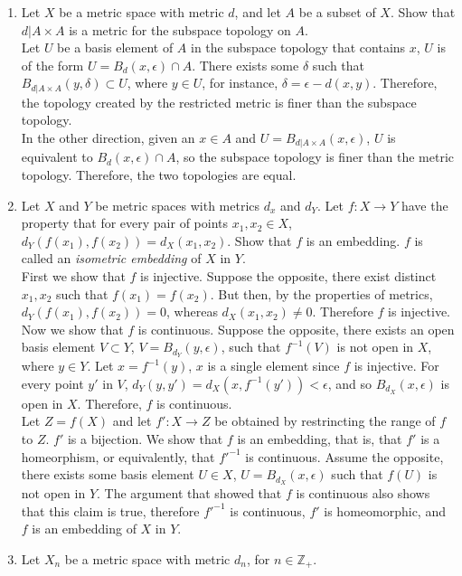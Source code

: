 \documentclass[12pt,letterpaper]{article}
\begin{document}
\RaggedRight
\begin{enumerate}
  \item Let $X$ be a metric space with metric $d$, and let $A$ be a subset of $X$. Show that $d|A\times A$ is a metric for the subspace topology on $A$.\\
  Let $U$ be a basis element of $A$ in the subspace topology that contains $x$, $U$ is of the form $U=B_d(x,\epsilon) \cap A$. There exists some $\delta$ such that $B_{d|A\times A}(y,\delta)\subset U$, where $y\in U$, for instance, $\delta = \epsilon - d(x,y)$. Therefore, the topology created by the restricted metric is finer than the subspace topology.\\
  In the other direction, given an $x\in A$ and $U=B_{d|A\times A}(x,\epsilon)$, $U$ is equivalent to $B_d(x, \epsilon)\cap A$, so the subspace topology is finer than the metric topology. Therefore, the two topologies are equal.
  \item Let $X$ and $Y$ be metric spaces with metrics $d_x$ and $d_Y$. Let $f:X\rightarrow Y$ have the property that for every pair of points $x_1,x_2\in X$, $d_Y(f(x_1),f(x_2))=d_X(x_1,x_2)$. Show that $f$ is an embedding. $f$ is called an \emph{isometric embedding} of $X$ in $Y$. \\
  First we show that $f$ is injective. Suppose the opposite, there exist distinct $x_1,x_2$ such that $f(x_1)=f(x_2)$. But then, by the properties of metrics, $d_Y(f(x_1),f(x_2)) = 0$, whereas $d_X(x_1, x_2)\neq 0$. Therefore $f$ is injective. \\
  Now we show that $f$ is continuous.  Suppose the opposite, there exists an open basis element $V\subset Y$, $V=B_{d_Y}(y,\epsilon)$, such that $f^{-1}(V)$ is not open in $X$, where $y\in Y$. Let $x=f^{-1}(y)$, $x$ is a single element since $f$ is injective. For every point $y'$ in $V$,  $d_Y(y,y')=d_X(x,f^{-1}(y'))<\epsilon$, and so $B_{d_X}(x,\epsilon)$ is open in $X$. Therefore, $f$ is continuous. \\
  Let $Z=f(X)$ and let $f': X\rightarrow Z$ be obtained by restrincting the range of $f$ to $Z$. $f'$ is a bijection. We show that $f$ is an embedding, that is, that $f'$ is a homeorphism, or equivalently, that $f'^{-1}$ is continuous. Assume the opposite, there exists some basis element $U\in X$, $U=B_{d_X}(x,\epsilon)$ such that $f(U)$ is not open in $Y$. The argument that showed that $f$ is continuous also shows that this claim is true, therefore $f'^{-1}$ is continuous, $f'$ is homeomorphic, and $f$ is an embedding of $X$ in $Y$.
  \item Let $X_n$ be a metric space with metric $d_n$, for $n\in \mathbb{Z}_+$.

\end{enumerate}
\end{document}
